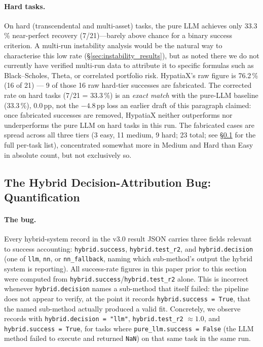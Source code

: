 \documentclass[twoside,11pt]{article}
\begin{document}
\paragraph{Hard tasks.}
On hard (transcendental and multi-asset) tasks, the pure LLM achieves only 33.3\,\%
near-perfect recovery (7/21)---barely above chance for a binary success criterion. A
multi-run instability analysis would be the natural way to characterise this low
rate (\S\ref{sec:instability_results}), but as noted there we do not currently
have verified multi-run data to attribute it to specific formulas such as
Black--Scholes, Theta, or correlated portfolio risk. HypatiaX's raw figure is 76.2\,\%
(16 of 21) --- 9 of those 16 raw hard-tier successes are fabricated. The corrected rate on hard
tasks (7/21 = 33.3\,\%) is an \emph{exact match} with the pure-LLM baseline
(33.3\,\%), $0.0$\,pp, not the $-4.8$\,pp loss an earlier draft of this paragraph
claimed: once fabricated successes are removed, HypatiaX neither outperforms nor
underperforms the pure LLM on hard tasks in this run.
The fabricated cases are spread across all three tiers (3 easy, 11 medium, 9 hard;
23 total; see \S\ref{sec:hybrid-attribution-bug} for the full per-task list),
concentrated somewhat more in Medium and Hard than Easy in absolute count, but
not exclusively so.

\subsection{The Hybrid Decision-Attribution Bug: Quantification}
\label{sec:hybrid-attribution-bug}

\paragraph{The bug.} Every hybrid-system record in the v3.0 result JSON carries
three fields relevant to success accounting: \texttt{hybrid.success},
\texttt{hybrid.test\_r2}, and \texttt{hybrid.decision} (one of \texttt{llm},
\texttt{nn}, or \texttt{nn\_fallback}, naming which sub-method's output the
hybrid system is reporting). All success-rate figures in this paper prior to
this section were computed from \texttt{hybrid.success}/\texttt{hybrid.test\_r2}
alone. This is incorrect whenever \texttt{hybrid.decision} names a sub-method
that itself failed: the pipeline does not appear to verify, at the point it
records \texttt{hybrid.success = True}, that the named sub-method actually
produced a valid fit. Concretely, we observe records with
\texttt{hybrid.decision = "llm"}, \texttt{hybrid.test\_r2} $\approx 1.0$, and
\texttt{hybrid.success = True}, for tasks where \texttt{pure\_llm.success =
False} (the LLM method failed to execute and returned \texttt{NaN}) on that
same task in the same run.
\end{document}
